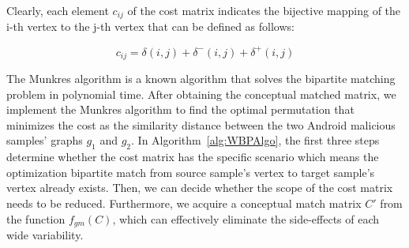  Clearly, each element $c_{ij}$ of the cost matrix indicates the bijective mapping of the i-th vertex to the j-th vertex that can be defined as follows:
  
  \begin{equation}
        \label{eq:cost_element}
 c_{ij} = \delta \left ( i, j \right ) + \delta^{-} \left ( i, j \right ) + \delta^{+} \left ( i, j \right )
   \end{equation}

The Munkres algorithm \cite{p:Munkres57} \cite{p:Kuhn56} is a known algorithm that solves the bipartite matching problem in polynomial time. After obtaining the conceptual matched matrix,  we implement the Munkres algorithm to find the optimal permutation that minimizes the cost as the similarity distance between the two Android malicious samples' graphs $g_{1}$ and $g_{2}$. In Algorithm~\ref{alg:WBPAlgo}, the first three steps determine whether the cost matrix has the specific scenario which means the optimization bipartite match from source sample's vertex to target sample's vertex already exists. Then, we can decide whether the scope of the cost matrix needs to be reduced. Furthermore, we acquire a conceptual match matrix $C'$ from the function $f_{gm}(C)$, which can effectively eliminate the side-effects of each wide variability.
